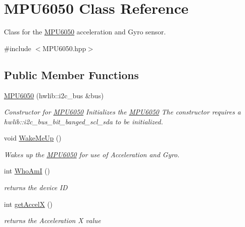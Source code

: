 \hypertarget{classMPU6050}{}\section{M\+P\+U6050 Class Reference}
\label{classMPU6050}


Class for the \hyperlink{classMPU6050}{M\+P\+U6050} acceleration and Gyro sensor.  




{\ttfamily \#include $<$M\+P\+U6050.\+hpp$>$}

\subsection*{Public Member Functions}
\begin{DoxyCompactItemize}
\item 
\mbox{\label{classMPU6050_ab01f3365fdb11237fa02852308d67ca7}} 
\hyperlink{classMPU6050_ab01f3365fdb11237fa02852308d67ca7}{M\+P\+U6050} (hwlib\+::i2c\+\_\+bus \&bus)
\begin{DoxyCompactList}\small\item\em Constructor for \hyperlink{classMPU6050}{M\+P\+U6050}  Initializes the \hyperlink{classMPU6050}{M\+P\+U6050} The constructor requires a hwlib\+::i2c\+\_\+bus\+\_\+bit\+\_\+banged\+\_\+scl\+\_\+sda to be initialized. \end{DoxyCompactList}\item 
void \hyperlink{classMPU6050_a56a203c7d63199222421ecf82716e992}{Wake\+Me\+Up} ()
\begin{DoxyCompactList}\small\item\em Wakes up the \hyperlink{classMPU6050}{M\+P\+U6050} for use of Acceleration and Gyro. \end{DoxyCompactList}\item 
int \hyperlink{classMPU6050_ab33eb589ca8b001745611b1f12d389f6}{Who\+AmI} ()
\begin{DoxyCompactList}\small\item\em returns the device ID \end{DoxyCompactList}\item 
int \hyperlink{classMPU6050_a4078364234bcadc11c3872dfad80525b}{get\+AccelX} ()
\begin{DoxyCompactList}\small\item\em returns the Acceleration X value \end{DoxyCompactList}\item 

\end{DoxyCompactItemize}
